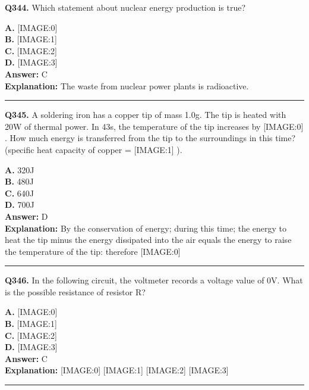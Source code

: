 \documentclass[12pt]{article}
\begin{document}
\noindent
\textbf{Q344.} Which statement about nuclear energy production is true?



\textbf{A.} [IMAGE:0] \\
\textbf{B.} [IMAGE:1] \\
\textbf{C.} [IMAGE:2] \\
\textbf{D.} [IMAGE:3] \\

\textbf{Answer:} C \\
\textbf{Explanation:} The waste from nuclear power plants is radioactive.

\hrule
\vspace{1em}


\noindent
\textbf{Q345.} A soldering iron has a copper tip of mass 1.0g.
The tip is heated with 20W of thermal power. In 43s, the temperature of the tip increases by
[IMAGE:0]
.
How much energy is transferred from the tip to the surroundings in this time? (specific heat capacity of copper =
[IMAGE:1]
).



\textbf{A.} 320J \\
\textbf{B.} 480J \\
\textbf{C.} 640J \\
\textbf{D.} 700J \\

\textbf{Answer:} D \\
\textbf{Explanation:} By the conservation of energy; during this time; the energy to heat the tip minus the energy dissipated into the air equals the energy to raise the temperature of the tip: therefore
[IMAGE:0]

\hrule
\vspace{1em}


\noindent
\textbf{Q346.} In the following circuit, the voltmeter records a voltage value of 0V.
What is the possible resistance of resistor R?



\textbf{A.} [IMAGE:0] \\
\textbf{B.} [IMAGE:1] \\
\textbf{C.} [IMAGE:2] \\
\textbf{D.} [IMAGE:3] \\

\textbf{Answer:} C \\
\textbf{Explanation:} [IMAGE:0]
[IMAGE:1]
[IMAGE:2]
[IMAGE:3]

\hrule
\vspace{1em}
\end{document}
